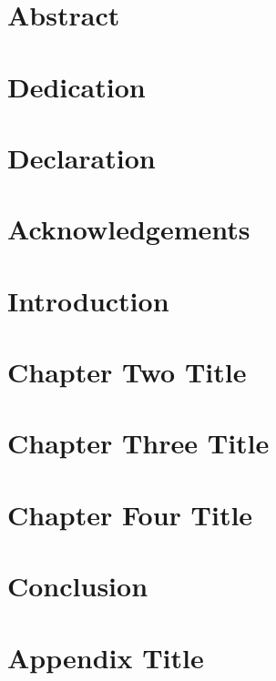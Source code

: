 \documentclass[french]{report}
\begin{document}



\chapter*{Abstract}


\chapter*{Dedication}


\chapter*{Declaration}


\chapter*{Acknowledgements}


\tableofcontents


\chapter{Introduction}


\chapter{Chapter Two Title}


\chapter{Chapter Three Title}


\chapter{Chapter Four Title}


\chapter{Conclusion}


\appendix
\chapter{Appendix Title}




\listoffigures
\end{document}
